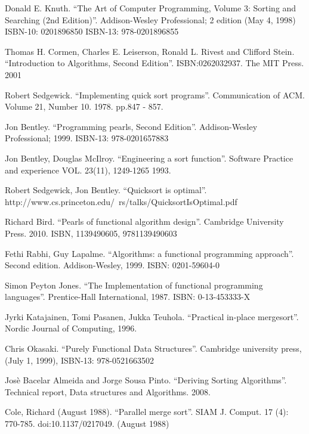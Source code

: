 \documentclass[UTF8]{article}
\begin{document}
\begin{thebibliography}{99}

Donald E. Knuth. ``The Art of Computer Programming, Volume 3: Sorting and Searching (2nd Edition)''. Addison-Wesley Professional; 2 edition (May 4, 1998) ISBN-10: 0201896850 ISBN-13: 978-0201896855

Thomas H. Cormen, Charles E. Leiserson, Ronald L. Rivest and Clifford Stein.
``Introduction to Algorithms, Second Edition''. ISBN:0262032937. The MIT Press. 2001

Robert Sedgewick. ``Implementing quick sort programs''. Communication of ACM. Volume 21, Number 10. 1978. pp.847 - 857.

Jon Bentley. ``Programming pearls, Second Edition''. Addison-Wesley Professional; 1999. ISBN-13: 978-0201657883

Jon Bentley, Douglas McIlroy. ``Engineering a sort function''. Software Practice and experience VOL. 23(11), 1249-1265 1993.

Robert Sedgewick, Jon Bentley. ``Quicksort is optimal''. http://www.cs.princeton.edu/~rs/talks/QuicksortIsOptimal.pdf

Richard Bird. ``Pearls of functional algorithm design''. Cambridge University Press. 2010. ISBN, 1139490605, 9781139490603

Fethi Rabhi, Guy Lapalme. ``Algorithms: a functional programming approach''. Second edition. Addison-Wesley, 1999. ISBN: 0201-59604-0

Simon Peyton Jones. ``The Implementation of functional programming languages''. Prentice-Hall International, 1987. ISBN: 0-13-453333-X

Jyrki Katajainen, Tomi Pasanen, Jukka Teuhola. ``Practical in-place mergesort''. Nordic Journal of Computing, 1996.

Chris Okasaki. ``Purely Functional Data Structures''. Cambridge university press, (July 1, 1999), ISBN-13: 978-0521663502

Jos\`{e} Bacelar Almeida and Jorge Sousa Pinto. ``Deriving Sorting Algorithms''. Technical report, Data structures and Algorithms. 2008.

Cole, Richard (August 1988). ``Parallel merge sort''. SIAM J. Comput. 17 (4): 770-785. doi:10.1137/0217049. (August 1988)


\end{thebibliography}
\end{document}
